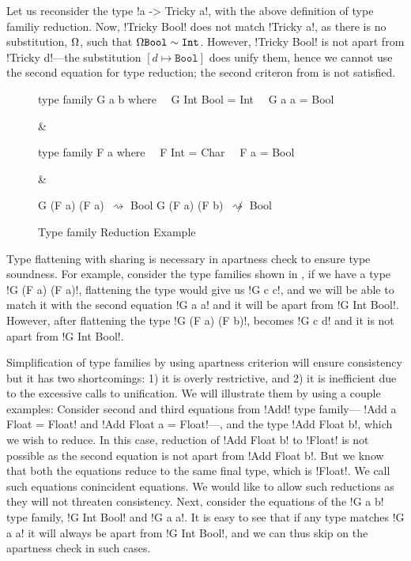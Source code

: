 \documentclass[format=acmsmall,manuscript,review,screen,nonacm,margin=1in,11pt]{acmart}
\begin{document}
Let us reconsider the type !a -> Tricky a!, with the above definition of type familiy reduction.
Now, !Tricky Bool! does not match !Tricky a!, as there is no substitution,
$\Omega$, such that $\Omega\texttt{Bool} \mathrel{\sim} \texttt{Int}$.
However, !Tricky Bool! is not apart from !Tricky d!---the substitution $[d\mapsto\texttt{Bool}]$ does unify them,
hence we cannot use the second equation for type reduction; the second criteron from 
is not satisfied.
\begin{figure}[ht]
  \centering\small
  \begin{tabularx}\textwidth{X X X}
\begin{code}^^J
type family G a b where^^J
\ \ G Int Bool = Int^^J
\ \ G a   a    = Bool^^J
\end{code}&
\begin{code}^^J
type family F a where^^J
\ \ F Int    = Char^^J
\ \ F a      = Bool^^J
\end{code}&
\begin{code}^^J
G (F a) (F a)\ $\mathrel{\rightsquigarrow}$ Bool^^J
G (F a) (F b)\ $\mathrel{\not\rightsquigarrow}$ Bool^^J
\end{code}
  \end{tabularx}
  \caption{Type family Reduction Example}
  \label{fig:ctf-red-ex}
\end{figure}

Type flattening with sharing is necessary in apartness check to ensure type soundness.
For example, consider the type families shown in ,
if we have a type !G (F a) (F a)!, flattening the type would give us !G c c!,
and we will be able to match it with the second equation !G a a! and it will
be apart from !G Int Bool!. However, after flattening the type !G (F a) (F b)!,
becomes !G c d! and it is not apart from !G Int Bool!.

Simplification of type families by using apartness criterion will ensure consistency
but it has two shortcomings: 1) it is overly restrictive, and 2) it is inefficient due to the excessive calls to unification.
We will illustrate them by using a couple examples: Consider second and third equations from !Add! type family---
!Add a Float = Float! and !Add Float a = Float!---, and the type !Add Float b!, which we wish to reduce.
In this case, reduction of !Add Float b! to !Float! is not possible as the second equation is not apart
from !Add Float b!. But we know that both the equations reduce to the same final type, which is !Float!.
We call such equations conincident equations. We would like to allow such reductions as they will not
threaten consistency. Next, consider the equations of the !G a b! type family, !G Int Bool! and !G a a!.
It is easy to see that if any type matches !G a a! it will always be apart from !G Int Bool!, and
we can thus skip on the apartness check in such cases.
\end{document}
